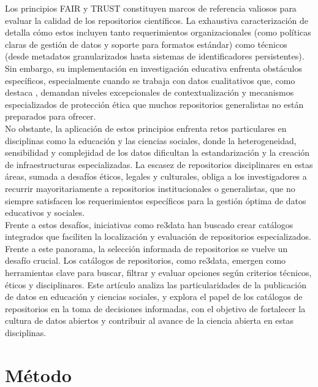 \documentclass[runningheads]{llncs}
\begin{document}
Los principios FAIR \citep{wilkinson2016} y TRUST \citep{Lin2020TRUST} constituyen marcos de referencia valiosos para evaluar la calidad de los repositorios científicos. La exhaustiva caracterización de \cite{behnke_2020_5361952} detalla cómo estos incluyen tanto requerimientos organizacionales (como políticas claras de gestión de datos y soporte para formatos estándar) como técnicos (desde metadatos granularizados hasta sistemas de identificadores persistentes). Sin embargo, su implementación en investigación educativa enfrenta obstáculos específicos, especialmente cuando se trabaja con datos cualitativos que, como  destaca \cite{antonio}, demandan niveles excepcionales de contextualización y mecanismos especializados de protección ética que muchos repositorios generalistas no están preparados para ofrecer.\\

No obstante, la aplicación de estos principios enfrenta retos particulares en disciplinas como la educación y las ciencias sociales, donde la heterogeneidad, sensibilidad y complejidad de los datos dificultan la estandarización y la creación de infraestructuras especializadas. La escasez de repositorios disciplinares en estas áreas, sumada a desafíos éticos, legales y culturales, obliga a los investigadores a recurrir mayoritariamente a repositorios institucionales o generalistas, que no siempre satisfacen los requerimientos específicos para la gestión óptima de datos educativos y sociales.\\

Frente a estos desafíos, iniciativas como re3data \citep{pampel2013} han buscado crear catálogos integrados que faciliten la localización y evaluación de repositorios especializados.\\

Frente a este panorama, la selección informada de repositorios se vuelve un desafío crucial. Los catálogos de repositorios, como re3data, emergen como herramientas clave para buscar, filtrar y evaluar opciones según criterios técnicos, éticos y disciplinares. Este artículo analiza las particularidades de la publicación de datos en educación y ciencias sociales, y explora el papel de los catálogos de repositorios en la toma de decisiones informadas, con el objetivo de fortalecer la cultura de datos abiertos y contribuir al avance de la ciencia abierta en estas disciplinas.\\

\section{Método}
\end{document}
